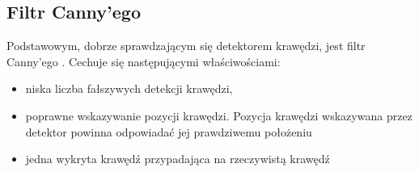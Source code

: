 \subsection{Filtr Canny'ego}
Podstawowym, dobrze sprawdzającym się detektorem krawędzi, jest filtr Canny'ego \cite{T5}. 
Cechuje się następującymi właściwościami: %

\begin{itemize}
\item niska liczba fałszywych detekcji krawędzi,
\item poprawne wskazywanie pozycji krawędzi. Pozycja krawędzi wskazywana przez detektor powinna odpowiadać jej prawdziwemu położeniu
\item jedna wykryta krawędź przypadająca na rzeczywistą krawędź
\end{itemize}

